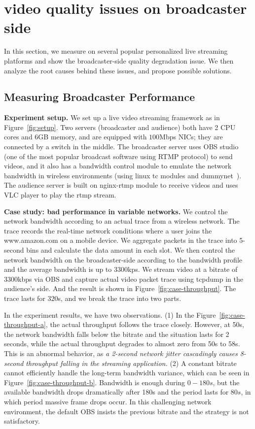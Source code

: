 \section{video quality issues on broadcaster side}

In this section, we measure on several popular personalized live streaming platforms and show the broadcaster-side quality degradation issue. We then analyze the root causes behind these issues, and propose possible solutions.

\subsection{Measuring Broadcaster Performance}

\textbf{Experiment setup.} We set up a live video streaming framework as in Figure~\ref{fig:setup}. Two servers (broadcaster and audience) both have 2 CPU cores and 6GB memory, and are equipped with $100$Mbps NICs; they are connected by a switch in the middle.
The broadcaster server uses OBS studio\cite{OBS} (one of the most popular broadcast software using RTMP protocol) to send videos, and it also has a bandwidth control module to emulate the network bandwidth in wireless environments (using linux tc modules and dummynet~\cite{dummynet}). The audience server is built on nginx-rtmp module to receive videos and uses VLC player to play the rtmp stream.


\textbf{Case study: bad performance in variable networks.} We control the network bandwidth according to an actual trace from a wireless network. The trace records the real-time network conditions where a user joins the www.amazon.com on a mobile device. We aggregate packets in the trace into 5-second bins and calculate the data amount in each slot. We then control the network bandwidth on the broadcaster-side according to the bandwidth profile and the average bandwidth is up to $3300$kps. We stream video at a bitrate of $3300$kbps via OBS and capture actual video packet trace using tcpdump in the audience's side. And the result is shown in Figure~\ref{fig:case-throughput}. The trace lasts for $320$s, and we break the trace into two parts.

In the experiment results, we have two observations. (1) In the Figure~\ref{fig:case-throughput-a}, the actual throughput follows the trace closely. However, at 50s, the network bandwidth falls below the bitrate and the situation lasts for 2 seconds, while the actual throughput degrades to almost zero from 50s to 58s. This is an abnormal behavior, as \textit{a 2-second network jitter cascadingly causes 8-second throughput falling in the streaming application.} (2) A constant bitrate cannot efficiently handle the long-term bandwidth variance, which can be seen in Figure~\ref{fig:case-throughput-b}. Bandwidth is enough during $0-180s$, but the available bandwidth drops dramatically after 180s and the period lasts for $80s$, in which period massive frame drops occur. In this challenging network environment, the default OBS insists the previous bitrate and the strategy is not satisfactory.

